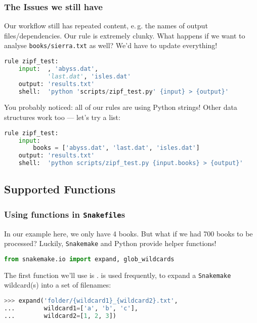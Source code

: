 \begin{frame}[fragile]
  \frametitle{The Issues we still have}
  Our workflow still has repeated content, e.\,g. the names of output files/dependencies. Our  rule is extremely clunky. What happens if we want to analyse \texttt{books/sierra.txt} as well? We’d have to update everything!
  \begin{lstlisting}[language=Python,style=Python, basicstyle=\tiny]
rule zipf_test:
    input:  , 'abyss.dat',
            'last.dat', 'isles.dat'
    output: 'results.txt'
    shell:  'python 'scripts/zipf_test.py' {input} > {output}'
  \end{lstlisting}
  You probably noticed: all of our rules are using Python strings! Other data structures work too — let’s try a list:
  \begin{lstlisting}[language=Python,style=Python, basicstyle=\tiny]
rule zipf_test:
    input:
        books = ['abyss.dat', 'last.dat', 'isles.dat']
    output: 'results.txt'
    shell:  'python scripts/zipf_test.py {input.books} > {output}'
  \end{lstlisting}
\end{frame}

\subsection{Supported Functions}

\begin{frame}[fragile]
  \frametitle{Using functions in \texttt{Snakefile}s}
  In our example here, we only have 4 books. But what if we had 700 books to be processed? \newline
  Luckily, \texttt{Snakemake} and Python provide helper functions!
  \begin{lstlisting}[language=Python,style=Python]
from snakemake.io import expand, glob_wildcards
  \end{lstlisting}
  The first function we’ll use is .  is used frequently, to expand a \texttt{Snakemake} wildcard(s) into a set of filenames:
  \begin{lstlisting}[language=Python,style=Python]
>>> expand('folder/{wildcard1}_{wildcard2}.txt',
...        wildcard1=['a', 'b', 'c'],
...        wildcard2=[1, 2, 3])
  \end{lstlisting}
\end{frame}

